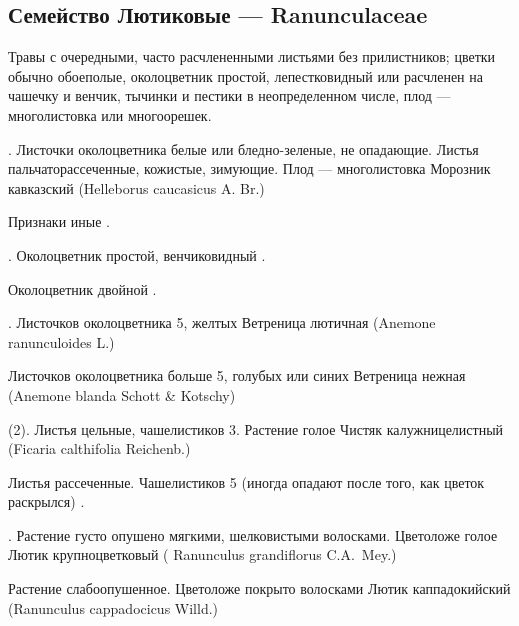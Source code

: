 \documentclass{article}
\begin{document}
\subsection{Семейство Лютиковые --- Ranunculaceae\label{Ran}}

Травы с очередными, часто расчлененными листьями без
прилистников; цветки обычно обоеполые, околоцветник простой,
лепестковидный или расчленен на чашечку и венчик, тычинки и
пестики в неопределенном числе, плод --- многолистовка или
многоорешек.

. Листочки околоцветника белые или бледно-зеленые, не
опадающие. Листья пальчаторассеченные, кожистые, зимующие. Плод
--- многолистовка \TT Морозник кавказский (\NN Helleborus
caucasicus A. Br.)

\AN Признаки иные .

. Околоцветник простой, венчиковидный .

\AN Околоцветник двойной .

\newpage

. Листочков околоцветника 5, желтых \TT
Ветреница лютичная (\NN Anemone ranunculoides
L.)

\AN Листочков околоцветника больше 5, голубых или синих \TT
Вет\-ре\-ни\-ца нежная (\NN Anemone blanda Schott \& Kotschy)

(2). Листья цельные, чашелистиков 3. Растение голое \TT
Чистяк калужницелистный (\NN Ficaria calthifolia
Reichenb.)

\AN Листья рассеченные. Чашелистиков 5 (иногда опадают после
того, как цветок раскрылся) .

. Растение густо опушено мягкими, шелковистыми волосками.
Цветоложе голое \TT Лютик крупноцветковый (\NN
Ranunculus grandiflorus C.A.~Mey.)

\AN Растение слабоопушенное. Цветоложе покрыто волосками \TT
Лютик каппадокийский (\NN Ranunculus cappadocicus Willd.)

\printindex
\end{document}
